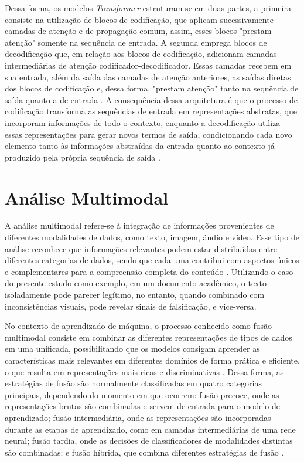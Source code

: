 Dessa forma, os modelos \textit{Transformer} estruturam-se em duas partes, a primeira consiste na utilização de blocos de codificação, que aplicam sucessivamente camadas de atenção e de propagação comum, assim, esses blocos "prestam atenção" somente na sequência de entrada. A segunda emprega blocos de decodificação que, em relação aos blocos de codificação, adicionam camadas intermediárias de atenção codificador-decodificador. Essas camadas recebem em sua entrada, além da saída das camadas de atenção anteriores, as saídas diretas dos blocos de codificação e, dessa forma, "prestam atenção" tanto na sequência de saída quanto a de entrada \cite{transformer}. A consequência dessa arquitetura é que o processo de codificação transforma as sequências de entrada em representações abstratas, que incorporam informações de todo o contexto, enquanto a decodificação utiliza essas representações para gerar novos termos de saída, condicionando cada novo elemento tanto às informações abstraídas da entrada quanto ao contexto já produzido pela própria sequência de saída \cite{transformer}.

\section{Análise Multimodal}

A análise multimodal refere-se à integração de informações provenientes de diferentes modalidades de dados, como texto, imagem, áudio e vídeo. Esse tipo de análise reconhece que informações relevantes podem estar distribuídas entre diferentes categorias de dados, sendo que cada uma contribui com aspectos únicos e complementares para a compreensão completa do conteúdo \cite{multimodalsurvey}. Utilizando o caso do presente estudo como exemplo, em um documento acadêmico, o texto isoladamente pode parecer legítimo, no entanto, quando combinado com inconsistências visuais, pode revelar sinais de falsificação, e vice-versa.

No contexto de aprendizado de máquina, o processo conhecido como fusão multimodal consiste em combinar as diferentes representações de tipos de dados em uma unificada, possibilitando que os modelos consigam aprender as características mais relevantes em diferentes domínios de forma prática e eficiente, o que resulta em representações mais ricas e discriminativas \cite{multimodalsurvey,multimodalforgery}. Dessa forma, as estratégias de fusão são normalmente classificadas em quatro categorias principais, dependendo do momento em que ocorrem: fusão precoce, onde as representações brutas são combinadas e servem de entrada para o modelo de aprendizado; fusão intermediária, onde as representações são incorporadas durante as etapas de aprendizado, como em camadas intermediárias de uma rede neural; fusão tardia, onde as decisões de classificadores de modalidades distintas são combinadas; e fusão híbrida, que combina diferentes estratégias de fusão \cite{multimodalsurvey}.

